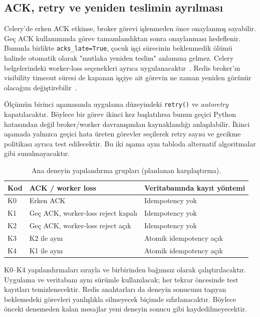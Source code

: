\documentclass[conference,a4paper]{IEEEtran}
\newcommand{\eng}[1]{\textit{#1}}
\newcommand{\code}[1]{\texttt{#1}}
\begin{document}
\subsection{ACK, retry ve yeniden teslimin ayrılması}
Celery'de erken ACK etkinse, broker görevi işlenmeden önce onaylanmış sayabilir. Geç ACK kullanımında görev tamamlandıktan sonra onaylanması hedeflenir. Bununla birlikte \code{acks\_late=True}, çocuk işçi sürecinin beklenmedik ölümü halinde otomatik olarak "mutlaka yeniden teslim" anlamına gelmez. Celery belgelerindeki worker-loss seçenekleri ayrıca uygulanacaktır~\cite{celerytasks}. Redis broker'ın visibility timeout süresi de kapanan işçiye ait görevin ne zaman yeniden görünür olacağını değiştirebilir~\cite{celeryredis}.

Ölçümün birinci aşamasında uygulama düzeyindeki \code{retry()} ve \eng{autoretry} kapatılacaktır. Böylece bir görev ikinci kez başlatılırsa bunun geçici Python hatasından değil broker/worker davranışından kaynaklandığı anlaşılabilir. İkinci aşamada yalnızca geçici hata üreten görevler seçilerek retry sayısı ve gecikme politikası ayrıca test edilecektir. Bu iki aşama aynı tabloda alternatif algoritmalar gibi sunulmayacaktır.

\begin{table}[t]
\caption{Ana deneyin yapılandırma grupları (planlanan karşılaştırma).}
\centering\footnotesize
\begin{tabularx}{\columnwidth}{@{}p{8mm}p{19mm}X@{}}
\toprule
Kod & ACK / worker loss & Veritabanında kayıt yöntemi\\
\midrule
K0 & Erken ACK & Idempotency yok\\
K1 & Geç ACK, worker-loss reject kapalı & Idempotency yok\\
K2 & Geç ACK, worker-loss reject açık & Idempotency yok\\
K3 & K2 ile aynı & Atomik idempotency açık\\
K4 & K1 ile aynı & Atomik idempotency açık\\
\bottomrule
\end{tabularx}
\label{tab:configs}
\end{table}

K0--K4 yapılandırmaları sırayla ve birbirinden bağımsız olarak çalıştırılacaktır. Uygulama ve veritabanı aynı sürümle kullanılacak; her tekrar öncesinde test kayıtları temizlenecektir. Redis anahtarları da deneyin sonucunu taşıyan beklemedeki görevleri yanlışlıkla silmeyecek biçimde sıfırlanacaktır. Böylece önceki denemeden kalan mesajlar yeni deneyin sonucu gibi kaydedilmeyecektir.
\end{document}
